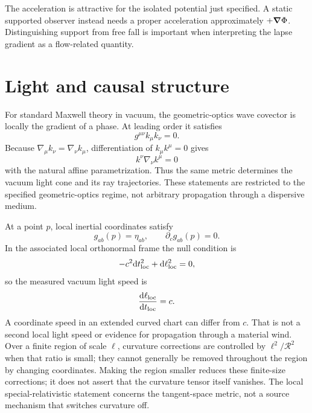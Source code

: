 \documentclass[11pt]{article}
\begin{document}
The acceleration is attractive for the isolated potential just specified. A static supported observer instead needs a proper acceleration approximately $+\boldsymbol\nabla\Phi$. Distinguishing support from free fall is important when interpreting the lapse gradient as a flow-related quantity.

\section{Light and causal structure}
For standard Maxwell theory in vacuum, the geometric-optics wave covector is locally the gradient of a phase. At leading order it satisfies
\begin{equation}
g^{\mu\nu}k_\mu k_\nu=0.
\label{eq:null}
\end{equation}
Because $\nabla_\mu k_\nu=\nabla_\nu k_\mu$, differentiation of $k_\mu k^\mu=0$ gives
\begin{equation}
k^\nu\nabla_\nu k^\mu=0
\label{eq:nullgeodesic}
\end{equation}
with the natural affine parametrization. Thus the same metric determines the vacuum light cone and its ray trajectories. These statements are restricted to the specified geometric-optics regime, not arbitrary propagation through a dispersive medium.

At a point $p$, local inertial coordinates satisfy
\begin{equation}
g_{ab}(p)=\eta_{ab},\qquad \partial_cg_{ab}(p)=0.
\label{eq:localinertial}
\end{equation}
In the associated local orthonormal frame the null condition is
\begin{equation}
-c^2\mathrm d t_{\rm loc}^2+\mathrm d\ell_{\rm loc}^2=0,
\label{eq:localminkowski}
\end{equation}
so the measured vacuum light speed is
\begin{equation}
\frac{\mathrm d\ell_{\rm loc}}{\mathrm d t_{\rm loc}}=c.
\label{eq:localc}
\end{equation}
A coordinate speed in an extended curved chart can differ from $c$. That is not a second local light speed or evidence for propagation through a material \Aether{} wind. Over a finite region of scale $\ell$, curvature corrections are controlled by $\ell^2/\mathcal R^2$ when that ratio is small; they cannot generally be removed throughout the region by changing coordinates. Making the region smaller reduces these finite-size corrections; it does not assert that the curvature tensor itself vanishes. The local special-relativistic statement concerns the tangent-space metric, not a source mechanism that switches curvature off.
\end{document}
